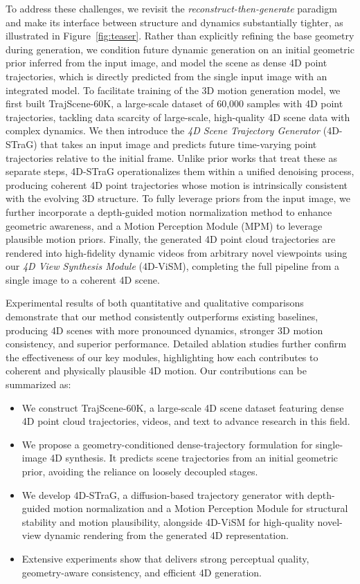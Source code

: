 To address these challenges, we revisit the \textit{reconstruct-then-generate} paradigm and make its interface between structure and dynamics substantially tighter, as illustrated in Figure~\ref{fig:teaser}. Rather than explicitly refining the base geometry during generation, we condition future dynamic generation on an initial geometric prior inferred from the input image, and model the scene as dense 4D point trajectories, which is directly predicted from the single input image with an integrated model. To facilitate training of the 3D motion generation model, we first built TrajScene-60K, a large-scale dataset of 60,000 samples with 4D point trajectories, tackling data scarcity of large-scale, high-quality 4D scene data with complex dynamics. We then introduce the \textit{4D Scene Trajectory Generator} (4D-STraG) that takes an input image and predicts future time-varying point trajectories relative to the initial frame. Unlike prior works that treat these as separate steps, 4D-STraG operationalizes them within a unified denoising process, producing coherent 4D point trajectories whose motion is intrinsically consistent with the evolving 3D structure. To fully leverage priors from the input image, we further incorporate a depth-guided motion normalization method to enhance geometric awareness, and a Motion Perception Module (MPM) to leverage plausible motion priors. Finally, the generated 4D point cloud trajectories are rendered into high-fidelity dynamic videos from arbitrary novel viewpoints using our \textit{4D View Synthesis Module} (4D-ViSM), completing the full pipeline from a single image to a coherent 4D scene. 

Experimental results of both quantitative and qualitative comparisons demonstrate that our method consistently outperforms existing baselines, producing 4D scenes with more pronounced dynamics, stronger 3D motion consistency, and superior performance. Detailed ablation studies further confirm the effectiveness of our key modules, highlighting how each contributes to coherent and physically plausible 4D motion. Our contributions can be summarized as:

\begin{itemize}
    \item We construct TrajScene-60K, a large-scale 4D scene dataset featuring dense 4D point cloud trajectories, videos, and text to advance research in this field.
    \item We propose a geometry-conditioned dense-trajectory formulation for single-image 4D synthesis. It predicts scene trajectories from an initial geometric prior, avoiding the reliance on loosely decoupled stages.
    \item We develop 4D-STraG, a diffusion-based trajectory generator with depth-guided motion normalization and a Motion Perception Module for structural stability and motion plausibility, alongside 4D-ViSM for high-quality novel-view dynamic rendering from the generated 4D representation.
    \item Extensive experiments show that \ours delivers strong perceptual quality, geometry-aware consistency, and efficient 4D generation.
\end{itemize}